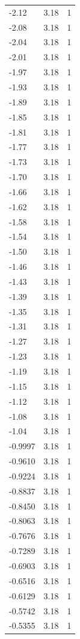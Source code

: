 \begin{longtable}{lrr}
  -2.12 & 3.18 & 1 \\
  -2.08 & 3.18 & 1 \\
  -2.04 & 3.18 & 1 \\
  -2.01 & 3.18 & 1 \\
  -1.97 & 3.18 & 1 \\
  -1.93 & 3.18 & 1 \\
  -1.89 & 3.18 & 1 \\
  -1.85 & 3.18 & 1 \\
  -1.81 & 3.18 & 1 \\
  -1.77 & 3.18 & 1 \\
  -1.73 & 3.18 & 1 \\
  -1.70 & 3.18 & 1 \\
  -1.66 & 3.18 & 1 \\
  -1.62 & 3.18 & 1 \\
  -1.58 & 3.18 & 1 \\
  -1.54 & 3.18 & 1 \\
  -1.50 & 3.18 & 1 \\
  -1.46 & 3.18 & 1 \\
  -1.43 & 3.18 & 1 \\
  -1.39 & 3.18 & 1 \\
  -1.35 & 3.18 & 1 \\
  -1.31 & 3.18 & 1 \\
  -1.27 & 3.18 & 1 \\
  -1.23 & 3.18 & 1 \\
  -1.19 & 3.18 & 1 \\
  -1.15 & 3.18 & 1 \\
  -1.12 & 3.18 & 1 \\
  -1.08 & 3.18 & 1 \\
  -1.04 & 3.18 & 1 \\
  -0.9997 & 3.18 & 1 \\
  -0.9610 & 3.18 & 1 \\
  -0.9224 & 3.18 & 1 \\
  -0.8837 & 3.18 & 1 \\
  -0.8450 & 3.18 & 1 \\
  -0.8063 & 3.18 & 1 \\
  -0.7676 & 3.18 & 1 \\
  -0.7289 & 3.18 & 1 \\
  -0.6903 & 3.18 & 1 \\
  -0.6516 & 3.18 & 1 \\
  -0.6129 & 3.18 & 1 \\
  -0.5742 & 3.18 & 1 \\
  -0.5355 & 3.18 & 1 \\

\end{longtable}
